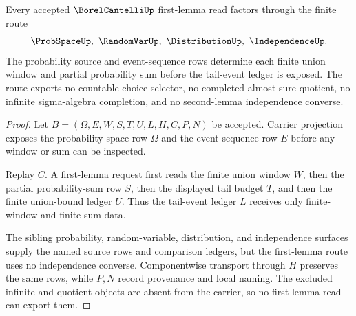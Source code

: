\begin{theorem}
\label{thm:borel-cantelli-first-lemma-finite-sum-route}
Every accepted $\BorelCantelliUp$ first-lemma read factors through the finite route
$$
\ProbSpaceUp,\ \RandomVarUp,\ \DistributionUp,\ \IndependenceUp .
$$
The probability source and event-sequence rows determine each finite union window and partial probability sum before the tail-event ledger is exposed. The route exports no countable-choice selector, no completed almost-sure quotient, no infinite sigma-algebra completion, and no second-lemma independence converse.
\end{theorem}
\begin{proof}
Let $B=(\Omega,E,W,S,T,U,L,H,C,P,N)$ be accepted. Carrier projection exposes the probability-space row $\Omega$ and the event-sequence row $E$ before any window or sum can be inspected.

Replay $C$. A first-lemma request first reads the finite union window $W$, then the partial probability-sum row $S$, then the displayed tail budget $T$, and then the finite union-bound ledger $U$. Thus the tail-event ledger $L$ receives only finite-window and finite-sum data.

The sibling probability, random-variable, distribution, and independence surfaces supply the named source rows and comparison ledgers, but the first-lemma route uses no independence converse. Componentwise transport through $H$ preserves the same rows, while $P,N$ record provenance and local naming. The excluded infinite and quotient objects are absent from the carrier, so no first-lemma read can export them.
\end{proof}


\begin{closurestatus}{\BorelCantelliUp}
  \theoryclosure{\seedClosure}
  \formalstatus{\unformalizedV}
\end{closurestatus}
